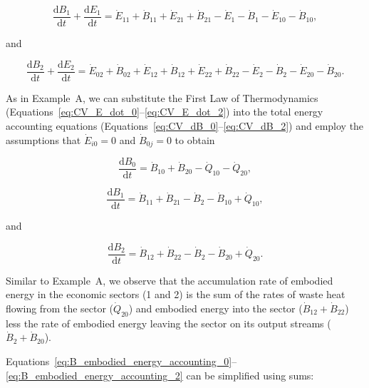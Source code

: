 \begin{equation} \label{eq:CV_dB_1}
	\frac{\mathrm{d}B_{1}}{\mathrm{d}t} 
	+ \frac{\mathrm{d}E_{1}}{\mathrm{d}t} 
	= \dot{E}_{11}
	+ \dot{B}_{11}
	+ \dot{E}_{21} 
	+ \dot{B}_{21} 
	- \dot{E}_1
	- \dot{B}_1
	- \dot{E}_{10} 
	- \dot{B}_{10},
\end{equation}

\noindent and 

\begin{equation} \label{eq:CV_dB_2}
	\frac{\mathrm{d}B_{2}}{\mathrm{d}t} 
	+ \frac{\mathrm{d}E_{2}}{\mathrm{d}t} 
	= \dot{E}_{02} 
	+ \dot{B}_{02} 
	+ \dot{E}_{12}
	+ \dot{B}_{12}
	+ \dot{E}_{22} 
	+ \dot{B}_{22} 
	- \dot{E}_{2} 
	- \dot{B}_{2} 
	- \dot{E}_{20} 
	- \dot{B}_{20}.
\end{equation}

As in Example~A, we can substitute the First Law of Thermodynamics 
(Equations~\ref{eq:CV_E_dot_0}--\ref{eq:CV_E_dot_2})
into the total energy accounting equations
(Equations~\ref{eq:CV_dB_0}--\ref{eq:CV_dB_2}) 
and employ the assumptions that 
$\dot{E}_{i0} = 0$ and
$\dot{B}_{0j} = 0$ 
to obtain

\begin{equation} \label{eq:B_embodied_energy_accounting_0}
	\frac{\mathrm{d}B_{0}}{\mathrm{d}t} 
	= \dot{B}_{10} 
	+ \dot{B}_{20} 
	- \dot{Q}_{10} 
	- \dot{Q}_{20}, 
\end{equation}

\begin{equation} \label{eq:B_embodied_energy_accounting_1}
	\frac{\mathrm{d}B_{1}}{\mathrm{d}t} 
	= \dot{B}_{11} 
	+ \dot{B}_{21}
	- \dot{B}_{2} 
	- \dot{B}_{10}
	+ \dot{Q}_{10},
\end{equation}

\noindent and

\begin{equation} \label{eq:B_embodied_energy_accounting_2}
	\frac{\mathrm{d}B_2}{\mathrm{d}t} 
	= \dot{B}_{12} 
	+ \dot{B}_{22} 
	- \dot{B}_{2}
	- \dot{B}_{20} 
	+ \dot{Q}_{20}.
\end{equation}

Similar to Example~A, we observe that the accumulation rate 
of embodied energy in the economic sectors (1 and 2) 
is the sum of the rates of waste heat flowing from the sector 
($\dot{Q}_{20}$) and embodied energy into the sector 
($\dot{B}_{12} + \dot{B}_{22}$) 
less the rate of embodied energy leaving the sector 
on its output streams ($\dot{B}_{2} + \dot{B}_{20}$).

Equations~\ref{eq:B_embodied_energy_accounting_0}--\ref{eq:B_embodied_energy_accounting_2}
can be simplified using sums:

